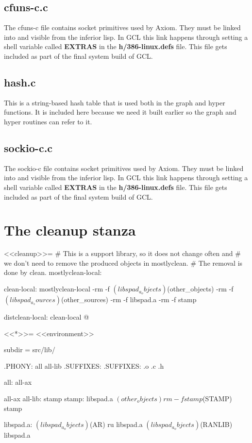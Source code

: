 \documentclass{article}
\begin{document}
\subsection{cfuns-c.c \cite{2}}
The cfuns-c file contains socket primitives used by Axiom.
They must be linked into and visible from the inferior lisp.
In GCL this link happens through setting a shell variable called
{\bf EXTRAS} in the {\bf h/386-linux.defs} file. This file
gets included as part of the final system build of GCL.

\subsection{hash.c \cite{6}}
This is a string-based hash table that is used both in the graph
and hyper functions. It is included here because we need it built
earlier so the graph and hyper routines can refer to it.

\subsection{sockio-c.c \cite{10}}
The sockio-c file contains socket primitives used by Axiom.
They must be linked into and visible from the inferior lisp.
In GCL this link happens through setting a shell variable called
{\bf EXTRAS} in the {\bf h/386-linux.defs} file. This file
gets included as part of the final system build of GCL.

\section{The cleanup stanza}
<<cleanup>>=
# This is a support library, so it does not change often and
# we don't need to remove the produced objects in mostlyclean.
# The removal is done by clean.
mostlyclean-local:

clean-local: mostlyclean-local
	-rm -f $(libspad_a_objects) $(other_objects)
	-rm -f $(libspad_a_sources) $(other_sources)
	-rm -f libspad.a
	-rm -f stamp

distclean-local: clean-local
@

<<*>>=
<<environment>>

subdir = src/lib/

.PHONY: all all-lib
.SUFFIXES:
.SUFFIXES: .o .c .h

all: all-ax

all-ax all-lib: stamp
stamp: libspad.a $(other_objects)
	rm -f stamp
	$(STAMP) stamp

libspad.a: $(libspad_a_objects)
	$(AR) ru libspad.a $(libspad_a_objects)
	$(RANLIB) libspad.a
\end{document}
